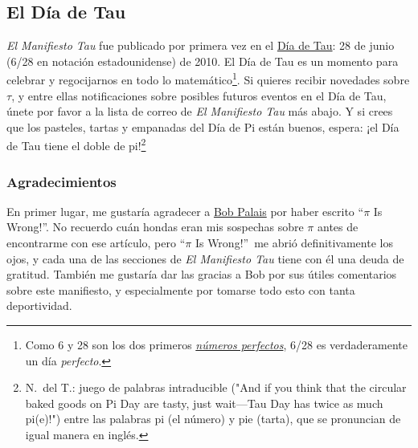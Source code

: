 

  \subsection{El Día de Tau} %
  \label{sec:tau_day}

\emph{El Manifiesto Tau} fue publicado por primera vez en el \href{http://tauday.com/}{Día de Tau}: 28 de junio (6/28 en notación estadounidense) de 2010. El Día de Tau es un momento para celebrar y regocijarnos en todo lo matemático\footnote{Como 6 y 28 son los dos primeros \href{https://es.wikipedia.org/wiki/Número_perfecto}{\emph{números perfectos}}, 6/28 es verdaderamente un día \emph{perfecto}.}. Si quieres recibir novedades sobre $\tau$, y entre ellas notificaciones sobre posibles futuros eventos en el Día de Tau, únete por favor a la lista de correo de \emph{El Manifiesto Tau} más abajo. Y si crees que los pasteles, tartas y empanadas del Día de Pi están buenos, espera: ¡el Día de Tau tiene el doble de pi!\footnote{N.~del T.: juego de palabras intraducible ("And if you think that the circular baked goods on Pi Day are tasty, just wait—Tau Day has twice as much pi(e)!") entre las palabras pi (el número) y pie (tarta), que se pronuncian de igual manera en inglés.}



  \subsubsection{Agradecimientos} %
  \label{sec:acknowledgments}

En primer lugar, me gustaría agradecer a \href{http://www.math.utah.edu/~palais}{Bob Palais} por haber escrito ``$\pi$ Is Wrong!''. No recuerdo cuán hondas eran mis sospechas sobre $\pi$ antes de encontrarme con ese artículo, pero ``$\pi$ Is Wrong!''\ me abrió definitivamente los ojos, y cada una de las secciones de \emph{El Manifiesto Tau} tiene con él una deuda de gratitud. También me gustaría dar las gracias a Bob por sus útiles comentarios sobre este manifiesto, y especialmente por tomarse todo esto con tanta deportividad.

